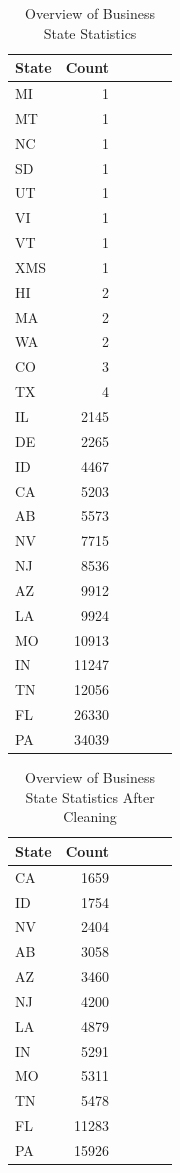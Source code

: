 \documentclass{stylefiles/capstone}
\begin{document}
\begin{table}[h!]
\centering
\begin{tabular}{l r r r r r} 
 \hline
 State & Count \\ [0.5ex] 
 \hline
MI & 1 \\
MT & 1 \\
NC & 1 \\
SD & 1 \\
UT & 1 \\
VI & 1 \\
VT & 1 \\
XMS & 1 \\
HI & 2 \\
MA & 2 \\
WA & 2 \\
CO & 3 \\
TX & 4  \\
IL & 2145 \\
DE & 2265 \\
ID & 4467 \\
CA & 5203 \\
AB & 5573 \\
NV & 7715 \\
NJ & 8536 \\
AZ & 9912  \\
LA & 9924 \\
MO & 10913 \\
IN & 11247 \\
TN & 12056  \\
FL & 26330 \\
PA & 34039 \\
 [1ex] 
 \hline
\end{tabular}
\caption{Overview of Business State Statistics}
\label{business_state_count_analysis}
\end{table}

\begin{table}[h!]
\centering
\begin{tabular}{l r r r r r} 
 \hline
 State & Count \\ [0.5ex] 
 \hline
CA & 1659  \\
ID & 1754  \\
NV & 2404  \\
AB & 3058  \\
AZ & 3460  \\
NJ & 4200  \\
LA & 4879  \\
IN & 5291  \\
MO & 5311  \\
TN & 5478  \\
FL & 11283  \\
PA & 15926 \\
 [1ex] 
 \hline
\end{tabular}
\caption{Overview of Business State Statistics After Cleaning}
\label{business_state_count_after_filter_analysis}
\end{table}
\end{document}

